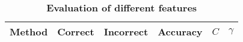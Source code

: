 \documentclass[11pt,english]{article}
\begin{document}
\begin{multicols}{2}

\begin{table*}
\begin{center}
\caption{\small \textbf{\textsf{Evaluation of different features}}}%
\begin{tabular}{l c c c c c}
\hline\hline
Method & Correct & Incorrect & Accuracy & $C$ & $\gamma$ \\[0.5ex]
\hline

\end{tabular}
\end{center}
\end{table*}
\end{multicols}
\end{document}
